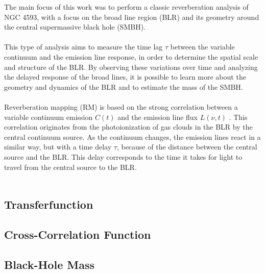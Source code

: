 The main focus of this work was to perform a classic reverberation analysis of NGC 4593, with a focus on the broad line region (BLR) and its geometry around the central supermassive black hole (SMBH).\\\\
This type of analysis aims to measure the time lag $\tau$ between the variable continuum and the emission line response, in order to determine the spatial scale and structure of the BLR. By observing these variations over time and analyzing the delayed response of the broad lines, it is possible to learn more about the geometry and dynamics of the BLR and to estimate the mass of the SMBH.\\\\
Reverberation mapping (RM) is based on the strong correlation between a variable continuum emission $C(t)$ and the emission line flux $L(\nu, t)$ \parencite{horne2021space}. This correlation originates from the photoionization of gas clouds in the BLR by the central continuum source. As the continuum changes, the emission lines react in a similar way, but with a time delay $\tau$, because of the distance between the central source and the BLR. This delay corresponds to the time it takes for light to travel from the central source to the BLR.\\\\

\subsection{Transferfunction}

\subsection{Cross-Correlation Function}

\subsection{Black-Hole Mass}

